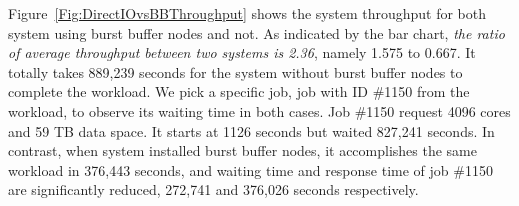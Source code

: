 
Figure~\ref{Fig:DirectIOvsBBThroughput} shows the system throughput for
both system using burst buffer nodes and not.
As indicated by the bar chart,
\textit{the ratio of average throughput between two systems is 2.36},
namely 1.575 to 0.667.
It totally takes 889,239 seconds for the system without burst buffer nodes to
complete the workload.
We pick a specific job, job with ID \#1150 from the workload, to observe its
waiting time in both cases.
Job \#1150 request 4096 cores and 59 TB data space.
It starts at 1126 seconds but waited 827,241 seconds.
In contrast, when system installed burst buffer nodes,
it accomplishes the same workload in 376,443 seconds, and waiting time and response time of job \#1150
are significantly reduced, 272,741 and 376,026 seconds respectively.


